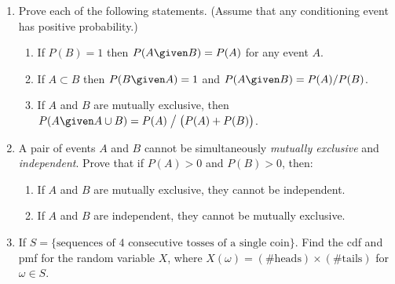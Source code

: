 \documentclass[12pt]{article}
\begin{document}
\begin{enumerate}
\item
Prove each of the following statements.
(Assume that any conditioning event has positive probability.)
  \begin{enumerate}
  \item If $P(B) = 1$ then $P(A\given B) = P(A)$ for any event $A$.
  \item If $A \subset B$ then $P(B\given A) = 1$ and
    $P(A\given B)=P(A) / P(B)$.
  \item If $A$ and $B$ are mutually exclusive, then
    $P(A\given A\cup B) = P(A) \bigm/ \bigl(P(A) + P(B)\bigr)$.
  \end{enumerate}

\item
A pair of events $A$ and $B$ cannot be simultaneously
\emph{mutually exclusive} and \emph{independent}.
Prove that if $P(A) > 0$ and $P(B) > 0$, then:
  \begin{enumerate}
  \item If $A$ and $B$ are mutually exclusive, they cannot be independent.
  \item If $A$ and $B$ are independent, they cannot be mutually exclusive.
  \end{enumerate}

\item
If $S = \{ \text{sequences of 4 consecutive tosses of a single coin} \}$.
Find the cdf and pmf for the random variable $X$, where
$X(\omega) = (\text{\# heads}) \times (\text{\# tails})$
for $\omega \in S$.
\end{enumerate}
\end{document}
